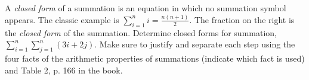 \begin{questions}







{} \ifprintanswers 
\else 
A \textit{closed form} of a summation is an equation
in which no summation symbol appears.  The classic example is
$\displaystyle \sum_{i=1}^n i = \frac{n(n+1)}{2}$.  The fraction on
the right is the \textit{closed form} of the summation. 
\fi  Determine closed forms for summation, $\displaystyle \sum_{i=1}^n \sum_{j=1}^n (3i+ 2j)$.  Make sure to justify and separate each step using the four facts of the arithmetic properties of summations (indicate which fact is used) and Table 2, p. 166 in the book.


\end{questions}
